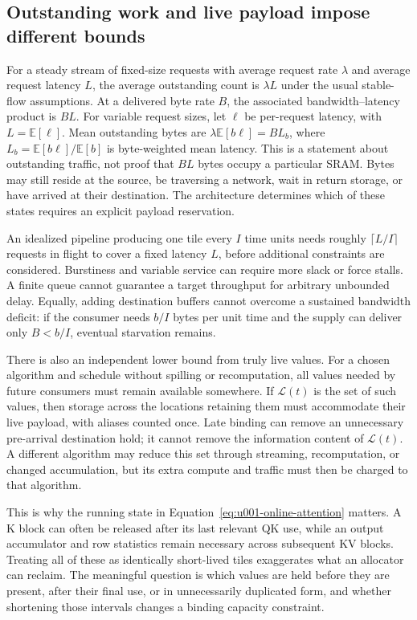\subsection{Outstanding work and live payload impose different bounds}

For a steady stream of fixed-size requests with average request rate $\lambda$ and average request latency $L$, the average outstanding count is $\lambda L$ under the usual stable-flow assumptions. At a delivered byte rate $B$, the associated bandwidth--latency product is $BL$. For variable request sizes, let $\ell$ be per-request latency, with $L=\mathbb{E}[\ell]$. Mean outstanding bytes are $\lambda\mathbb{E}[b\ell]=B L_b$, where $L_b=\mathbb{E}[b\ell]/\mathbb{E}[b]$ is byte-weighted mean latency. This is a statement about outstanding traffic, not proof that $BL$ bytes occupy a particular SRAM. Bytes may still reside at the source, be traversing a network, wait in return storage, or have arrived at their destination. The architecture determines which of these states requires an explicit payload reservation.

An idealized pipeline producing one tile every $I$ time units needs roughly $\lceil L/I\rceil$ requests in flight to cover a fixed latency $L$, before additional constraints are considered. Burstiness and variable service can require more slack or force stalls. A finite queue cannot guarantee a target throughput for arbitrary unbounded delay. Equally, adding destination buffers cannot overcome a sustained bandwidth deficit: if the consumer needs $b/I$ bytes per unit time and the supply can deliver only $B<b/I$, eventual starvation remains.

There is also an independent lower bound from truly live values. For a chosen algorithm and schedule without spilling or recomputation, all values needed by future consumers must remain available somewhere. If $\mathcal{L}(t)$ is the set of such values, then storage across the locations retaining them must accommodate their live payload, with aliases counted once. Late binding can remove an unnecessary pre-arrival destination hold; it cannot remove the information content of $\mathcal{L}(t)$. A different algorithm may reduce this set through streaming, recomputation, or changed accumulation, but its extra compute and traffic must then be charged to that algorithm.

This is why the running state in Equation~\ref{eq:u001-online-attention} matters. A K block can often be released after its last relevant QK use, while an output accumulator and row statistics remain necessary across subsequent KV blocks. Treating all of these as identically short-lived tiles exaggerates what an allocator can reclaim. The meaningful question is which values are held before they are present, after their final use, or in unnecessarily duplicated form, and whether shortening those intervals changes a binding capacity constraint.

